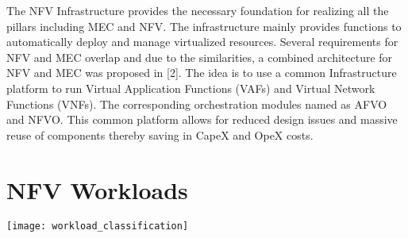 \documentclass[../seminar.tex]{subfiles}
\begin{document}
\begin{flushleft}	
The NFV Infrastructure provides the necessary foundation for realizing all the pillars including MEC and NFV. The infrastructure mainly provides functions to automatically deploy and manage virtualized resources. Several requirements for NFV and MEC overlap and due to the similarities, a combined architecture for NFV and MEC was proposed in [2]. The idea is to use a common Infrastructure platform to run Virtual Application Functions (VAFs) and Virtual Network Functions (VNFs). The corresponding orchestration modules named as AFVO and NFVO. This common platform allows for reduced design issues and massive reuse of components thereby saving in CapeX and OpeX costs.
\end{flushleft}

\section{NFV Workloads}

\texttt{[image: workload\_classification]}
\end{document}
